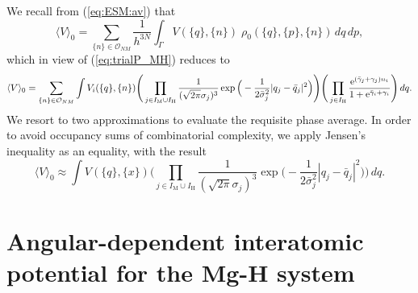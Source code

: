 \documentclass{article}
\begin{document}
We recall from (\ref{eq:ESM:av}) that
\begin{equation}
    \langle V \rangle_0
    =
    \sum_{\{{n}\}\in\mathcal{O}_{NM}} \frac{1}{h^{3N}}
    \int_{\Gamma}
    V(\{{q}\}, \{{n}\})
    \;
    \rho_0(\{{q}\}, \{{p}\}, \{{n}\})
    \, dq \, dp ,
\end{equation}
which in view of (\ref{eq:trialP_MH}) reduces to
\begin{equation}
\label{eq:mean-field-potential-jensen}
    \langle V \rangle_0
    =
    \sum_{\{{n}\}\in\mathcal{O}_{NM}}
    \int
        V_i(\{{q}\}, \{{n}\})
        \Bigg(
            \prod_{j\in{I_\text{M} \cup I_\text{H}}}
            \frac{1}{(\sqrt{2\pi}\sigma_j)^3}
            \exp
            \Big(
                -
                \frac{1}{2\bar{\sigma}_j^2}|{q}_j - \bar{{q}}_j|^2
            \Big)
        \Bigg)
        \Bigg(
            \prod_{j\in I_\text{H}}
            \frac
            {
                {\rm e}^{(\bar{\gamma}_{j}+\gamma_j) n_i}
            }
            {
                1 + {\rm e}^{\bar{\gamma}_{i}+\gamma_i}
            }
        \Bigg)
    \, dq .
\end{equation}
We resort to two approximations to evaluate the requisite phase average. In order to avoid occupancy sums of combinatorial complexity, we apply Jensen's inequality as an equality, with the result
\begin{equation}
    \langle V \rangle_0
    \approx
    \int
        V(\{{q}\}, \{{x}\})
        \Bigg(
            \prod_{j\in{I_\text{M} \cup I_\text{H}}}
            \frac{1}{(\sqrt{2\pi}\sigma_j)^3}
            \exp
            \Big(
                -
                \frac{1}{2\bar{\sigma}_j^2}|{q}_j - \bar{{q}}_j|^2
            \Big)
        \Bigg)
    \, dq .
\end{equation}


\section{Angular-dependent interatomic potential for the Mg-H system}
\end{document}
